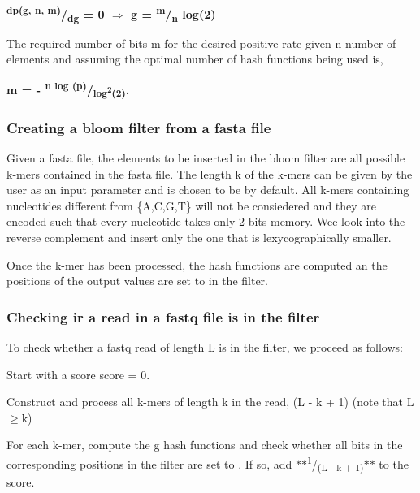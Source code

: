 {\bfseries  \textsuperscript{dp(g, n, m)}/\textsubscript{dg} = 0 {$\Rightarrow$} g = \textsuperscript{m}/\textsubscript{n} log(2) }

The required number of bits {\ttfamily m} for the desired positive rate given {\ttfamily n} number of elements and assuming the optimal number of hash functions being used is,

{\bfseries  m = -\/ \textsuperscript{n log (p)}/\textsubscript{log\textsuperscript{2}(2)}. }

\subsubsection*{Creating a bloom filter from a {\ttfamily fasta} file}

Given a {\ttfamily fasta} file, the elements to be inserted in the bloom filter are all possible {\ttfamily k}-\/mers contained in the {\ttfamily fasta} file. The length {\ttfamily k} of the {\ttfamily k}-\/mers can be given by the user as an input parameter and is chosen to be {} by default. All {\ttfamily k}-\/mers containing nucleotides different from {\ttfamily \{A,C,G,T\}} will not be consiedered and they are encoded such that every nucleotide takes only 2-\/bits memory. Wee look into the reverse complement and insert only the one that is lexycographically smaller.

Once the {\ttfamily k}-\/mer has been processed, the hash functions are computed an the positions of the output values are set to {} in the filter.

\subsubsection*{Checking ir a read in a {\ttfamily fastq} file is in the filter}

To check whether a {\ttfamily fastq} read of length {\ttfamily L} is in the filter, we proceed as follows\+:


\begin{DoxyEnumerate}
\item Start with a score {\ttfamily score = 0}.
\item Construct and process all {\ttfamily k}-\/mers of length {\ttfamily k} in the read, {\ttfamily (L -\/ k + 1)} (note that {\ttfamily L}{$\ge$}{\ttfamily k})
\item For each {\ttfamily k}-\/mer, compute the {\ttfamily g} hash functions and check whether all bits in the corresponding positions in the filter are set to {}. If so, add $\ast$$\ast$\textsuperscript{1}/\textsubscript{(L -\/ k + 1)}$\ast$$\ast$ to the score.
\end{DoxyEnumerate}

